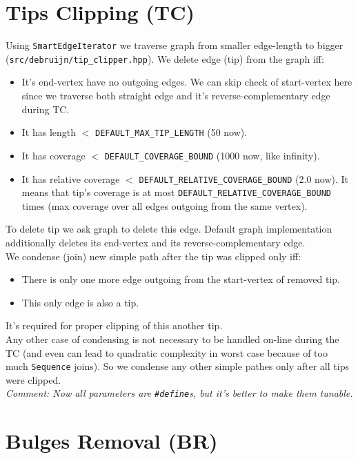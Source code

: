 \documentclass[14pt]{article}
\begin{document}
\section{Tips Clipping (TC)}

Using \texttt{SmartEdgeIterator} we traverse graph from smaller edge-length to bigger (\texttt{src/debruijn/tip\_clipper.hpp}). We delete edge (tip) from the graph iff:
\begin{itemize}
\item It's end-vertex have no outgoing edges. We can skip check of start-vertex here since we traverse both straight edge and it's reverse-complementary edge during TC. 
\item It has length $<$ \texttt{DEFAULT\_MAX\_TIP\_LENGTH} (50 now).
\item It has coverage $<$ \texttt{DEFAULT\_COVERAGE\_BOUND} (1000 now, like infinity).
\item It has relative coverage $<$ \texttt{DEFAULT\_RELATIVE\_COVERAGE\_BOUND} (2.0 now). It means that tip's coverage is at most \texttt{DEFAULT\_RELATIVE\_COVERAGE\_BOUND} times (max coverage over all edges outgoing from the same vertex).
\end{itemize} \vspace{0.5 cm}

To delete tip we ask graph to delete this edge. Default graph implementation additionally deletes its end-vertex and its reverse-complementary edge. \\

We condense (join) new simple path after the tip was clipped only iff:
\begin{itemize}
\item There is only one more edge outgoing from the start-vertex of removed tip.
\item This only edge is also a tip.
\end{itemize}
It's required for proper clipping of this another tip. \\

Any other case of condensing is not necessary to be handled on-line during the TC (and even can lead to quadratic complexity in worst case because of too much \texttt{Sequence} joins). So we condense any other simple pathes only after all tips were clipped. \\

\textit{Comment: Now all parameters are \texttt{\#define}s, but it's better to make them tunable.}

\section{Bulges Removal (BR)}
\end{document}
